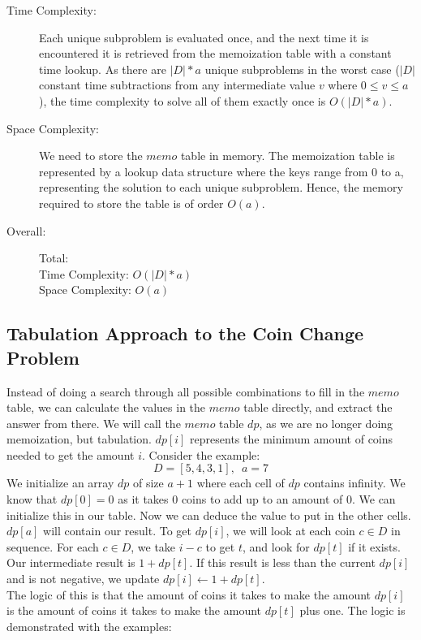 \begin{description}
    \item[Time Complexity:]
        Each unique subproblem is evaluated once, and the next time it is encountered it is retrieved from the memoization table with a constant time lookup.
        As there are $|D| * a$ unique subproblems in the worst case ($|D|$ constant time subtractions from any intermediate value $v$ where $0 \leq v \leq a$), the time complexity to solve all of them exactly once is $O(|D| * a)$.
    
        
    \item[Space Complexity:] 
        We need to store the $memo$ table in memory.
        The memoization table is represented by a lookup data structure where the keys range from 0 to a,
        representing the solution to each unique subproblem.
        Hence, the memory required to store the table is of order $O(a)$.
        
    \item[Overall:] Total:\\
        Time Complexity: $O(|D| * a)$\\
        Space Complexity: $O(a)$
        
\end{description}

\subsection{Tabulation Approach to the Coin Change Problem}

Instead of doing a search through all possible combinations to fill in the $memo$ table, we can calculate the values in the $memo$ table directly, and extract the answer from there.
We will call the $memo$ table $dp$, as we are no longer doing memoization, but tabulation.
$dp[i]$ represents the minimum amount of coins needed to get the amount $i$.
Consider the example:$$D = [5,4,3,1],\phantom{0} a = 7$$
We initialize an array $dp$ of size $a+1$ where each cell of $dp$ contains infinity.
We know that $dp[0] = 0$ as it takes $0$ coins to add up to an amount of $0$. We can initialize this in our table.
Now we can deduce the value to put in the other cells. $dp[a]$ will contain our result.
To get $dp[i]$, we will look at each coin $c \in D$ in sequence.
For each $c \in D$, we take $i - c$ to get $t$, and look for $dp[t]$ if it exists.
Our intermediate result is $1 + dp[t]$.
If this result is less than the current $dp[i]$ and is not negative, we update $dp[i] \leftarrow 1 + dp[t]$.\\
The logic of this is that the amount of coins it takes to make the amount $dp[i]$ is the amount of coins it takes to make the amount $dp[t]$ plus one.
The logic is demonstrated with the examples:

